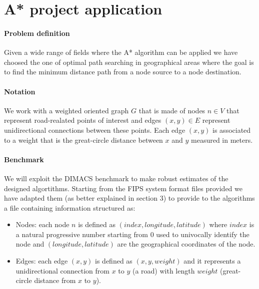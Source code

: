 \documentclass[twocolumn, switch]{article} %
\begin{document}
\section{A* project application}
\paragraph{Problem definition} Given a wide range of fields where the A* algorithm can be applied we have choosed the one of
optimal path searching in geographical areas where the goal is to find the minimum distance path from a 
node source to a node destination.

\paragraph{Notation} We work with a weighted oriented graph $G$ that is made of nodes $n \in V$ that represent
road-realated points of interest and edges $(x,y) \in E$ represent unidirectional connections between these points.
Each edge $(x, y)$ is associated to a weight that is the great-circle distance between $x$ and $y$ measured
in meters.
\paragraph{Benchmark} We will exploit the DIMACS benchmark to make robust estimates of the designed algortithms.
Starting from the FIPS system format files provided we have adapted them (as better explained in section 3) to provide
to the algorithms a file containing information structured as:
\begin{itemize}
  \item Nodes: each node $n$ is defined as $(index, longitude, latitude)$ where $index$ is a natural progressive
        number starting from $0$ used to univocally identify the node and $(longitude, latitude)$ are the geographical
        coordinates of the node.
  \item Edges: each edge $(x, y)$ is defined as $(x, y, weight)$ and it represents a unidirectional connection
        from $x$ to $y$ (a road) with length $weight$ (great-circle distance from $x$ to $y$).
\end{itemize}
\end{document}
